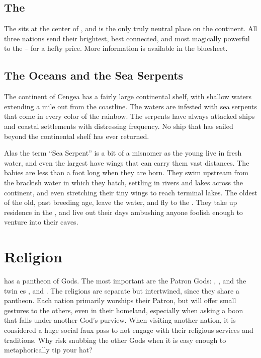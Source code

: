 \documentclass[blue]{GL2020}
\begin{document}
\subsection*{The \pSchool{}}
The \pSchool{} sits at the center of \pEarth{}, and is the only truly neutral place on the continent. All three nations send their brightest, best connected, and most magically powerful to the \pSc{} -- for a hefty price. More information is available in the \pSchool{} bluesheet.

\subsection*{The Oceans and the Sea Serpents}
The continent of Cengea has a fairly large continental shelf, with shallow waters extending a mile out from the coastline. The waters are infested with sea serpents that come in every color of the rainbow. The serpents have always attacked ships and coastal settlements with distressing frequency. No ship that has sailed beyond the continental shelf has ever returned.

Alas the term ``Sea Serpent'' is a bit of a misnomer as the young live in fresh water, and even the largest have wings that can carry them vast distances. The babies are less than a foot long when they are born. They swim upstream from the brackish water in which they hatch, settling in rivers and lakes across the continent, and even stretching their tiny wings to reach terminal lakes. The oldest of the old, past breeding age, leave the water, and fly to the \pSpine{}. They take up residence in the \pSpine{}, and live out their days ambushing anyone foolish enough to venture into their caves.

\section*{Religion}
\pEarth{} has a pantheon of Gods. The most important are the Patron Gods: \cFarmGod{}, \cTechGod{}, and the twin \cEbb{\God}es \cEbbFull{}, and \cFlowFull{}. The religions are separate but intertwined, since they share a pantheon. Each nation primarily worships their Patron, but will offer small gestures to the others, even in their homeland, especially when asking a boon that falls under another God’s purview. When visiting another nation, it is considered a huge social faux pass to not engage with their religious services and traditions. Why risk snubbing the other Gods when it is easy enough to metaphorically tip your hat?
\end{document}
